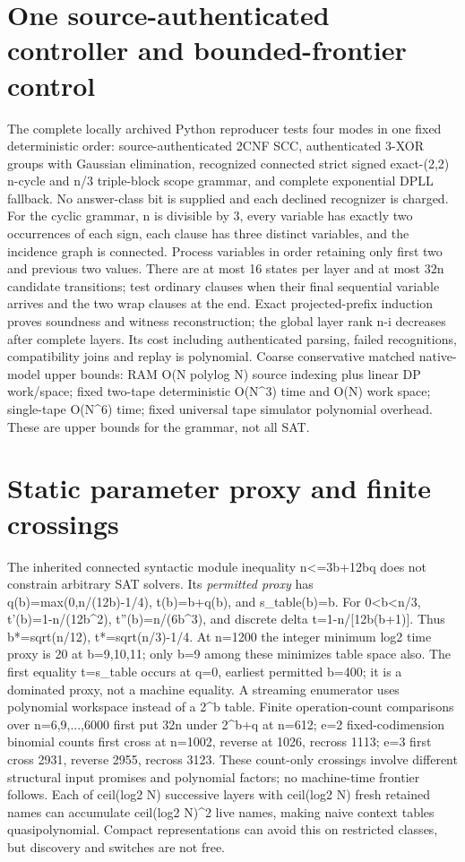 \documentclass[11pt]{article}
\begin{document}
\section{One source-authenticated controller and bounded-frontier control}
The complete locally archived Python reproducer tests four modes in one fixed deterministic order: source-authenticated 2CNF SCC, authenticated 3-XOR groups with Gaussian elimination, recognized connected strict signed exact-(2,2) n-cycle and n/3 triple-block scope grammar, and complete exponential DPLL fallback. No answer-class bit is supplied and each declined recognizer is charged. For the cyclic grammar, n is divisible by 3, every variable has exactly two occurrences of each sign, each clause has three distinct variables, and the incidence graph is connected. Process variables in order retaining only first two and previous two values. There are at most 16 states per layer and at most 32n candidate transitions; test ordinary clauses when their final sequential variable arrives and the two wrap clauses at the end. Exact projected-prefix induction proves soundness and witness reconstruction; the global layer rank n-i decreases after complete layers. Its cost including authenticated parsing, failed recognitions, compatibility joins and replay is polynomial. Coarse conservative matched native-model upper bounds: RAM O(N polylog N) source indexing plus linear DP work/space; fixed two-tape deterministic O(N^3) time and O(N) work space; single-tape O(N^6) time; fixed universal tape simulator polynomial overhead. These are upper bounds for the grammar, not all SAT.
\section{Static parameter proxy and finite crossings}
The inherited connected syntactic module inequality n<=3b+12bq does not constrain arbitrary SAT solvers. Its \emph{permitted proxy} has q(b)=max(0,n/(12b)-1/4), t(b)=b+q(b), and s_table(b)=b. For 0<b<n/3, t'(b)=1-n/(12b^2), t''(b)=n/(6b^3), and discrete delta t=1-n/[12b(b+1)]. Thus b*=sqrt(n/12), t*=sqrt(n/3)-1/4. At n=1200 the integer minimum log2 time proxy is 20 at b=9,10,11; only b=9 among these minimizes table space also. The first equality t=s_table occurs at q=0, earliest permitted b=400; it is a dominated proxy, not a machine equality. A streaming enumerator uses polynomial workspace instead of a 2^b table. Finite operation-count comparisons over n=6,9,...,6000 first put 32n under 2^{b+q} at n=612; e=2 fixed-codimension binomial counts first cross at n=1002, reverse at 1026, recross 1113; e=3 first cross 2931, reverse 2955, recross 3123. These count-only crossings involve different structural input promises and polynomial factors; no machine-time frontier follows.
Each of ceil(log2 N) successive layers with ceil(log2 N) fresh retained names can accumulate ceil(log2 N)^2 live names, making naive context tables quasipolynomial. Compact representations can avoid this on restricted classes, but discovery and switches are not free.
\end{document}
